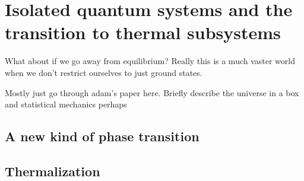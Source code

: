 
\chapter{Isolated quantum systems and \newline the transition to thermal subsystems}

What about if we go away from equilibrium? Really this is a much vaster world when we don't restrict ourselves to just ground states.

Mostly just go through adam's paper here. Briefly describe the universe in a box and statistical mechanics perhaps

\section{A new kind of phase transition}

\section{Thermalization}

